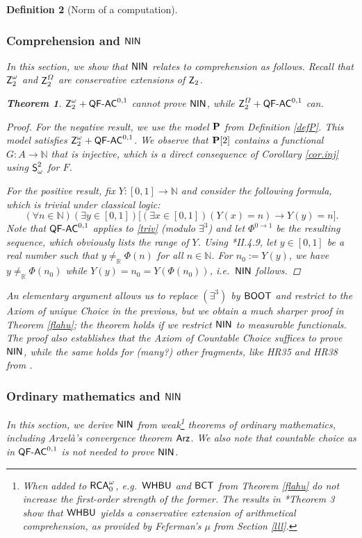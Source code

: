 \documentclass[reqno]{amsart}
\newtheorem{thm}{Theorem}
\newtheorem{defi}[thm]{Definition}
\newcommand\be{\begin{equation}}
\newcommand\ee{\end{equation}}
\def\Z{\textup{\textsf{Z}}}
\def\RCAo{\textup{\textsf{RCA}}_{0}^{\omega}}
\def\N{{\mathbb  N}}
\def\R{{\mathbb  R}}
\def\di{\rightarrow}
\def\QFAC{\textup{\textsf{QF-AC}}}
\def\Arz{\textup{\textsf{Arz}}}
\def\NIN{\textup{\textsf{NIN}}}
\def\BCT{\textup{\textsf{BCT}}}
\def\SS{\textup{\textsf{S}}}
\def\BOOT{\textup{\textsf{BOOT}}}
\def\WHBU{\textup{\textsf{WHBU}}}
\numberwithin{equation}{section}
\numberwithin{thm}{section}
\begin{document}
\begin{defi}[Norm of a computation]
\subsubsection{Comprehension and $\NIN$}\label{hogr}
In this section, we show that $\NIN$ relates to comprehension as follows.
Recall that $\Z_{2}^{\omega}$ and $\Z_{2}^{\Omega}$ are conservative extensions of $\Z_{2}$. 
\begin{thm}\label{dick}
$\Z_{2}^{\omega} + \QFAC^{0,1}$ cannot prove $\NIN$, while $\Z_{2}^{\Omega}+\QFAC^{0,1}$ can. 
\end{thm}
\begin{proof} 
For the negative result, we use the model ${\bf P}$ from Definition \ref{defP}. This model satisfies $\Z_2^\omega + \QFAC^{0,1}$. 
We observe that ${\bf P}[2]$ contains a functional $G:A \rightarrow \N$ that is \emph{injective}, which is a direct consequence of Corollary \ref{cor.inj} using $\SS^{2}_\omega$ for $F$.

\smallskip

For the positive result, fix $Y:[0,1]\di \N$ and consider the following formula, which is trivial under classical logic:
\be\label{triv}
(\forall n\in \N)(\exists y\in [0,1])\big[  (\exists x\in [0,1])(Y(x)=n)\di Y(y)=n \big].
\ee
Note that $\QFAC^{0,1}$ applies to \eqref{triv} (modulo $\exists^{3}$) and let $\Phi^{0\di 1}$ be the resulting sequence, which obviously lists the range of $Y$.  
Using \cite{simpson2}*{II.4.9}, let $y\in [0,1]$ be a real number such that $y\ne_{\R}\Phi(n)$ for all $n\in \N$.
For $n_{0}:=Y(y)$, we have $y\ne_{\R} \Phi(n_{0})$ while $Y(y)=n_{0}=Y(\Phi(n_{0}))$, i.e.\ $\NIN$ follows.
\end{proof}
An elementary argument allows us to replace $(\exists^{3})$ by $\BOOT$ and restrict to the Axiom of \emph{unique} Choice in the previous, but we obtain a much sharper proof in Theorem \ref{flahu}; the theorem holds if we restrict $\NIN$ to \emph{measurable} functionals.  The proof also establishes that the Axiom of Countable Choice suffices to prove $\NIN$, 
while the same holds for (many?) other fragments, like HR35 and HR38 from \cite{ConAC}.

\subsubsection{Ordinary mathematics and $\NIN$}\label{forgs}
In this section, we derive $\NIN$ from weak\footnote{When added to $\RCAo$, e.g.\ $\WHBU$ and $\BCT$ from Theorem \ref{flahu} do not increase the first-order strength of the former.  The results in \cite{kruisje}*{Theorem 3} show that $\WHBU$ yields a conservative extension of arithmetical comprehension, as provided by Feferman's $\mu$ from Section \ref{lll}.} theorems of ordinary mathematics, including Arzel\`a's convergence theorem $\Arz$.  
We also note that countable choice as in $\QFAC^{0,1}$ is not needed to prove $\NIN$.


\end{defi}
\end{document}
